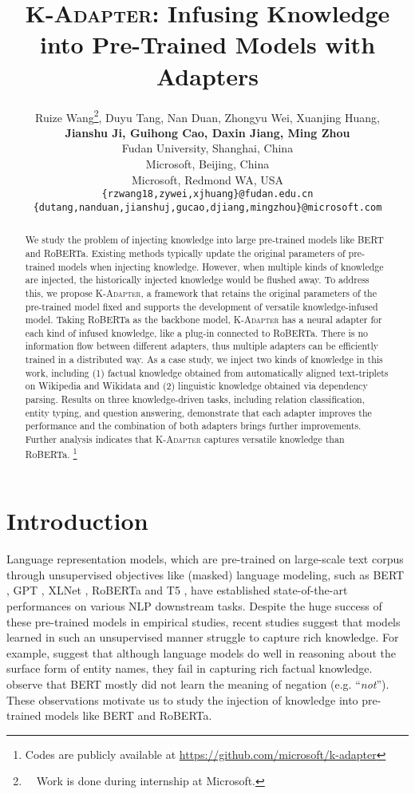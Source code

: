 \documentclass[11pt,a4paper]{article}
\title{\textsc{K-Adapter}: Infusing Knowledge into Pre-Trained Models with Adapters}
\author{
	Ruize Wang\thanks{~~Work is done during internship at Microsoft. }, 
	Duyu Tang, Nan Duan, Zhongyu Wei,
	Xuanjing Huang, \\ \textbf{Jianshu Ji, Guihong Cao, Daxin Jiang, Ming Zhou} \\

	Fudan University, Shanghai, China \\
	Microsoft, Beijing, China \\
	Microsoft, Redmond WA, USA \\
    {\tt \{rzwang18,zywei,xjhuang\}@fudan.edu.cn}\\
    {\tt \{dutang,nanduan,jianshuj,gucao,djiang,mingzhou\}@microsoft.com} 
}
\date{}
\begin{document}
\maketitle
\begin{abstract}
We study the problem of injecting knowledge into large pre-trained models like BERT and RoBERTa.
Existing methods typically update the original parameters of pre-trained models when injecting knowledge.
However, when multiple kinds of knowledge are injected, 
the historically injected knowledge would be flushed away.
To address this, we propose \textsc{K-Adapter}, a framework that retains the original parameters of the pre-trained model fixed and supports the development of versatile knowledge-infused model.
Taking RoBERTa as the backbone model, \textsc{K-Adapter} has a neural adapter for each kind of infused knowledge, like a plug-in connected to RoBERTa.
There is no information flow between different adapters, thus multiple adapters can be efficiently trained in a distributed way.
As a case study, we inject two kinds of knowledge in this work, including (1) factual knowledge obtained from automatically aligned text-triplets on Wikipedia and Wikidata and (2) linguistic knowledge obtained via dependency parsing. 
Results on three knowledge-driven tasks, including relation classification, entity typing, and question answering, demonstrate that each adapter improves the performance and the combination of both adapters brings further improvements. 
Further analysis indicates that 
\textsc{K-Adapter} captures versatile knowledge than RoBERTa.
\footnote{Codes are publicly available at \url{https://github.com/microsoft/k-adapter}}
\end{abstract}

\section{Introduction}
Language representation models, which are pre-trained on large-scale text corpus through unsupervised objectives like (masked) language modeling, such as BERT \citep{devlin2018bert}, GPT \citep{radford2018improving,radford2019language}, XLNet \citep{yang2019xlnet}, RoBERTa \citep{liu2019roberta} and T5 \citep{raffel2019exploring}, have established state-of-the-art performances on various NLP downstream tasks. 
Despite the huge success of these pre-trained models in empirical studies, recent studies suggest that models learned in such an unsupervised manner struggle to capture rich knowledge.
For example, \citet{poerner2019bert} suggest that although language models do well in reasoning about the surface form of entity names, they fail in capturing rich factual knowledge.
\citet{kassner2019negated} observe that BERT mostly did not learn the meaning of negation (e.g. ``\textit{not}''). These observations motivate us to study the injection of knowledge into pre-trained models like BERT and RoBERTa.
\end{document}
